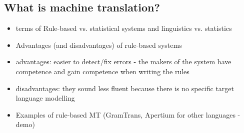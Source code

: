 \documentclass[a4paper,english,12pt]{article}
\begin{document}
\begin{spacing}{1.0}
\subsection{What is machine translation?}
\begin{itemize}
\item  terms of Rule-based vs. statistical systems and linguistics vs. statistics
\item  Advantages (and disadvantages) of rule-based systems
\item advantages: easier to detect/fix errors - the makers of the system have competence and gain competence when writing the rules
\item disadvantages: they sound less fluent because there is no specific target language modelling
\item    Examples of rule-based MT (GramTrans, Apertium for other languages - demo)
\end{itemize}


\end{spacing}
\end{document}
